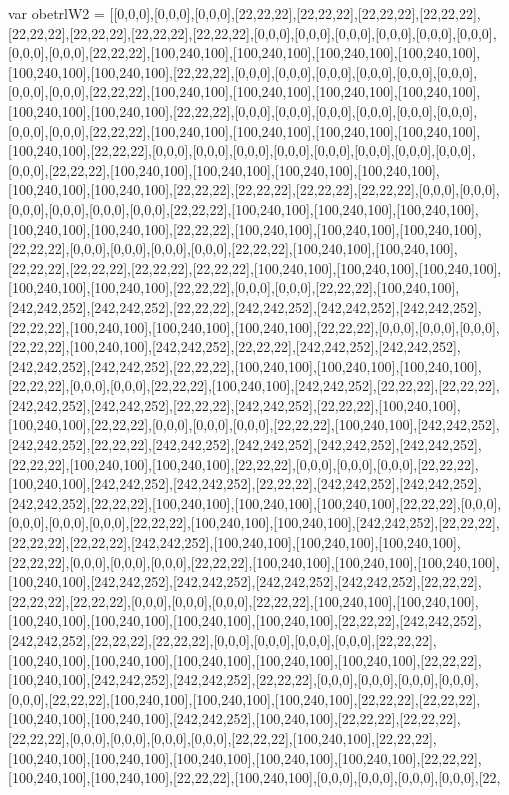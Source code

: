 var obetrlW2 = [[0,0,0],[0,0,0],[0,0,0],[22,22,22],[22,22,22],[22,22,22],[22,22,22],[22,22,22],[22,22,22],[22,22,22],[22,22,22],[0,0,0],[0,0,0],[0,0,0],[0,0,0],[0,0,0],[0,0,0],[0,0,0],[0,0,0],[22,22,22],[100,240,100],[100,240,100],[100,240,100],[100,240,100],[100,240,100],[100,240,100],[22,22,22],[0,0,0],[0,0,0],[0,0,0],[0,0,0],[0,0,0],[0,0,0],[0,0,0],[0,0,0],[22,22,22],[100,240,100],[100,240,100],[100,240,100],[100,240,100],[100,240,100],[100,240,100],[22,22,22],[0,0,0],[0,0,0],[0,0,0],[0,0,0],[0,0,0],[0,0,0],[0,0,0],[0,0,0],[22,22,22],[100,240,100],[100,240,100],[100,240,100],[100,240,100],[100,240,100],[22,22,22],[0,0,0],[0,0,0],[0,0,0],[0,0,0],[0,0,0],[0,0,0],[0,0,0],[0,0,0],[0,0,0],[22,22,22],[100,240,100],[100,240,100],[100,240,100],[100,240,100],[100,240,100],[100,240,100],[22,22,22],[22,22,22],[22,22,22],[22,22,22],[0,0,0],[0,0,0],[0,0,0],[0,0,0],[0,0,0],[0,0,0],[22,22,22],[100,240,100],[100,240,100],[100,240,100],[100,240,100],[100,240,100],[22,22,22],[100,240,100],[100,240,100],[100,240,100],[22,22,22],[0,0,0],[0,0,0],[0,0,0],[0,0,0],[22,22,22],[100,240,100],[100,240,100],[22,22,22],[22,22,22],[22,22,22],[22,22,22],[100,240,100],[100,240,100],[100,240,100],[100,240,100],[100,240,100],[22,22,22],[0,0,0],[0,0,0],[22,22,22],[100,240,100],[242,242,252],[242,242,252],[22,22,22],[242,242,252],[242,242,252],[242,242,252],[22,22,22],[100,240,100],[100,240,100],[100,240,100],[22,22,22],[0,0,0],[0,0,0],[0,0,0],[22,22,22],[100,240,100],[242,242,252],[22,22,22],[242,242,252],[242,242,252],[242,242,252],[242,242,252],[22,22,22],[100,240,100],[100,240,100],[100,240,100],[22,22,22],[0,0,0],[0,0,0],[22,22,22],[100,240,100],[242,242,252],[22,22,22],[22,22,22],[242,242,252],[242,242,252],[22,22,22],[242,242,252],[22,22,22],[100,240,100],[100,240,100],[22,22,22],[0,0,0],[0,0,0],[0,0,0],[22,22,22],[100,240,100],[242,242,252],[242,242,252],[22,22,22],[242,242,252],[242,242,252],[242,242,252],[242,242,252],[22,22,22],[100,240,100],[100,240,100],[22,22,22],[0,0,0],[0,0,0],[0,0,0],[22,22,22],[100,240,100],[242,242,252],[242,242,252],[22,22,22],[242,242,252],[242,242,252],[242,242,252],[22,22,22],[100,240,100],[100,240,100],[100,240,100],[22,22,22],[0,0,0],[0,0,0],[0,0,0],[0,0,0],[22,22,22],[100,240,100],[100,240,100],[242,242,252],[22,22,22],[22,22,22],[22,22,22],[242,242,252],[100,240,100],[100,240,100],[100,240,100],[22,22,22],[0,0,0],[0,0,0],[0,0,0],[22,22,22],[100,240,100],[100,240,100],[100,240,100],[100,240,100],[242,242,252],[242,242,252],[242,242,252],[242,242,252],[22,22,22],[22,22,22],[22,22,22],[0,0,0],[0,0,0],[0,0,0],[22,22,22],[100,240,100],[100,240,100],[100,240,100],[100,240,100],[100,240,100],[100,240,100],[22,22,22],[242,242,252],[242,242,252],[22,22,22],[22,22,22],[0,0,0],[0,0,0],[0,0,0],[0,0,0],[22,22,22],[100,240,100],[100,240,100],[100,240,100],[100,240,100],[100,240,100],[22,22,22],[100,240,100],[242,242,252],[242,242,252],[22,22,22],[0,0,0],[0,0,0],[0,0,0],[0,0,0],[0,0,0],[22,22,22],[100,240,100],[100,240,100],[100,240,100],[22,22,22],[22,22,22],[100,240,100],[100,240,100],[242,242,252],[100,240,100],[22,22,22],[22,22,22],[22,22,22],[0,0,0],[0,0,0],[0,0,0],[0,0,0],[22,22,22],[100,240,100],[22,22,22],[100,240,100],[100,240,100],[100,240,100],[100,240,100],[100,240,100],[22,22,22],[100,240,100],[100,240,100],[22,22,22],[100,240,100],[0,0,0],[0,0,0],[0,0,0],[0,0,0],[22,